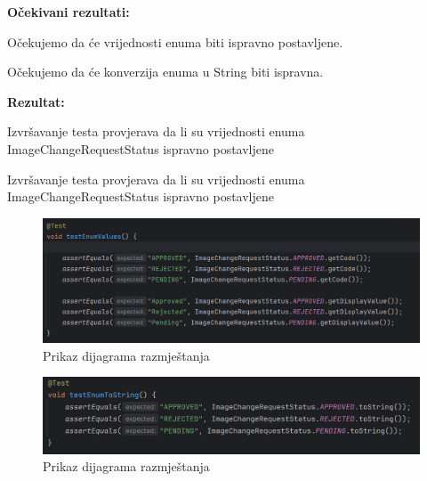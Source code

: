                                     \noindent\textbf{Očekivani rezultati:}
                                    \begin{packed_item}
                                    	\item Očekujemo da će vrijednosti enuma biti ispravno postavljene.
                                    	\item Očekujemo da će konverzija enuma u String biti ispravna.
                                    \end{packed_item}
                                    \noindent\textbf{Rezultat:}
                                    \begin{packed_item}
                                    	\item Izvršavanje testa provjerava da li su vrijednosti enuma ImageChangeRequestStatus ispravno postavljene
                                    	\item Izvršavanje testa provjerava da li su vrijednosti enuma ImageChangeRequestStatus ispravno postavljene
                                    \end{packed_item}
                                    
                                    
                        \begin{figure} [H]
                        	\centering
                        	\includegraphics[width=0.7\linewidth]{slike/ImageChangeTest.png}
                        	\caption{Prikaz dijagrama razmještanja}
                        	\label{fig:Prikaz dijagrama razmještanja}
                        \end{figure}
                        
                        \begin{figure} [H]
                        	\centering
                        	\includegraphics[width=0.7\linewidth]{slike/ImageChangeTest1.png}
                        	\caption{Prikaz dijagrama razmještanja}
                        	\label{fig:Prikaz dijagrama razmještanja}
                        \end{figure}
                                    
